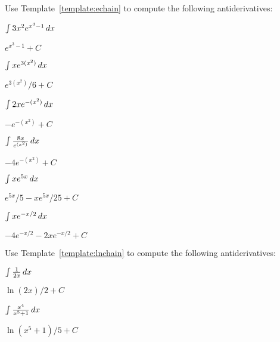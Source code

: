 \begin{exercises}
\noindent Use Template~\ref{template:echain} to compute the following
antiderivatives:

\begin{multicols}{2}
\begin{exercise}
$\int 3x^2 e^{x^3-1} \, d x$ 
\begin{answer}
$e^{x^3-1} + C$
\end{answer}
\end{exercise}

\begin{exercise}
$\int x e^{3(x^2)} \, d x$ 
\begin{answer}
$e^{3(x^2)}/6+C$
\end{answer}
\end{exercise}

\begin{exercise}
$\int 2x e^{-(x^2)} \, d x$ 
\begin{answer}
$-e^{-(x^2)} + C$
\end{answer}
\end{exercise}

\begin{exercise}
$\int \frac{8x}{e^{(x^2)}}\, d x$ 
\begin{answer}
$-4e^{-(x^2)} +C$
\end{answer}
\end{exercise}

\begin{exercise}
$\int x e^{5x} \, d x$ 
\begin{answer}
$e^{5x}/5 - x e^{5x}/25 + C$
\end{answer}
\end{exercise}

\begin{exercise}
$\int x e^{-x/2} \, d x$ 
\begin{answer}
$-4e^{-x/2}  - 2xe^{-x/2} +C$
\end{answer}
\end{exercise}
\end{multicols}

\noindent Use Template~\ref{template:lnchain} to compute the following
antiderivatives:

\begin{multicols}{2}
\begin{exercise}
$\int \frac{1}{2x} \, d x$
\begin{answer}
$\ln(2x)/2 + C$
\end{answer}
\end{exercise}

\begin{exercise}
$\int \frac{x^4}{x^5+1} \, d x$
\begin{answer}
$\ln(x^5+1)/5 +C$
\end{answer}
\end{exercise}


\end{multicols}
\end{exercises}
